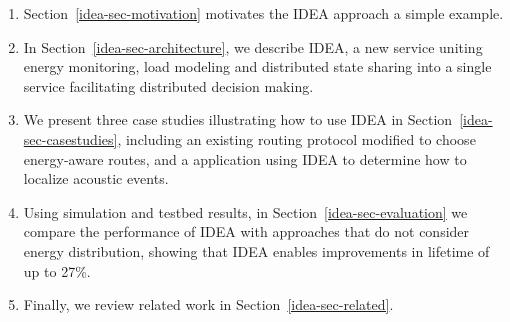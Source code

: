 \begin{enumerate}

\item Section~\ref{idea-sec-motivation} motivates the IDEA approach a simple
example.

\item In Section~\ref{idea-sec-architecture}, we describe IDEA, a new service
uniting energy monitoring, load modeling and distributed state sharing into a
single service facilitating distributed decision making.

\item We present three case studies illustrating how to use IDEA in
Section~\ref{idea-sec-casestudies}, including an existing routing protocol
modified to choose energy-aware routes, and a application using IDEA to
determine how to localize acoustic events.

\item Using simulation and testbed results, in
Section~\ref{idea-sec-evaluation} we compare the performance of IDEA with
approaches that do not consider energy distribution, showing that IDEA
enables improvements in lifetime of up to 27\%.

\item Finally, we review related work in Section~\ref{idea-sec-related}.

\end{enumerate}
